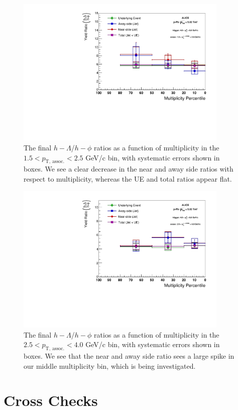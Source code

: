 \documentclass[ALICE,manyauthors]{ALICE_analysis_notes}
\begin{document}
\begin{figure}[ht]
\centering
\includegraphics[width=4in]{figures/lambda_phi_ratio_plot_lowpt.pdf}
\caption{The final $h-\Lambda$/$h-\phi$ ratios as a function of multiplicity in the $1.5 < p_{\text{T, assoc.}} < 2.5$ GeV/c bin, with systematic errors shown in boxes. We see a clear decrease in the near and away side ratios with respect to multiplicity, whereas the UE and total ratios appear flat.}
\label{lambda_phi_ratio_lowpt}
\end{figure}

\begin{figure}[ht]
\centering
\includegraphics[width=4in]{figures/lambda_phi_ratio_plot_highpt.pdf}
\caption{The final $h-\Lambda$/$h-\phi$ ratios as a function of multiplicity in the $2.5 < p_{\text{T, assoc.}} < 4.0$ GeV/c bin, with systematic errors shown in boxes. We see that the near and away side ratio sees a large spike in our middle multiplicity bin, which is being investigated.}
\label{lambda_phi_ratio_highpt}
\end{figure}


\clearpage
\section{Cross Checks}
\end{document}
